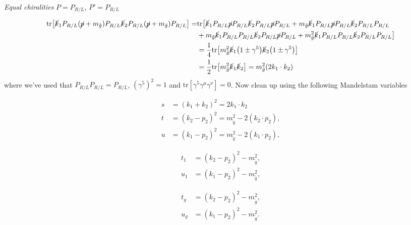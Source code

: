 \documentclass[11pt]{article}
\begin{document}
\begin{center}
\textit{Equal chiralities} $P=P_{R/L}$, $P'=P_{R/L}$
\end{center}
\begin{align*}
\text{tr} \big[ 
\cancel{k}_1 P_{R/L} (\cancel{p} + m_{\tilde{g}}) P_{R/L} \cancel{k}_2 P_{R/L} (\cancel{p} + m_{\tilde{g}}) P_{R/L} \big]=& \text{tr} \big[ 
\cancel{k}_1 P_{R/L} \cancel{p} P_{R/L} \cancel{k}_2 P_{R/L} \cancel{p}  P_{R/L}
+ m_{\tilde{g}} \cancel{k}_1 P_{R/L} \cancel{p} P_{R/L} \cancel{k}_2 P_{R/L} P_{R/L}\\
&+ m_{\tilde{g}} \cancel{k}_1 P_{R/L}P_{R/L} \cancel{k}_2 P_{R/L} \cancel{p} P_{R/L}
+ m_{\tilde{g}}^2 \cancel{k}_1 P_{R/L}  P_{R/L} \cancel{k}_2 P_{R/L} P_{R/L} \big]\\
&= \frac{1}{4} \text{tr} \big[ m_{\tilde{g}}^2 \cancel{k}_1 \big( 1 \pm \gamma^5 \big) \cancel{k}_2 \big( 1 \pm \gamma^5 \big)\big]\\
&= \frac{1}{2} \text{tr} \big[ m_{\tilde{g}}^2 \cancel{k}_1 \cancel{k}_2\big] =  m_{\tilde{g}}^2 (2 k_1 \cdot k_2)
\end{align*}
where we've used that $P_{R/L}P_{R/L} = P_{R/L}$, $(\gamma^5)^2 = 1$ and $\text{tr}[\gamma^5 \gamma^{\mu} \gamma^{\nu}]=0$. Now clean up using the following Mandelstam variables
\begin{multicols}{3}

\begin{align*}
s &= (k_1 + k_2)^2 = 2 k_1 \cdot k_2\\
t &= (k_2-p_2)^2 = m_{\tilde{q}}^2 - 2 (k_2 \cdot p_2),\\
u &= (k_1 - p_2)^2 = m_{\tilde{q}}^2 - 2 (k_1 \cdot p_2),
\end{align*}

\begin{align*}
t_1 &= (k_2-p_2)^2 - m_{\tilde{q}}^2,\\
u_1 &= (k_1-p_2)^2 - m_{\tilde{q}}^2,
\end{align*}

\begin{align*}
t_g &= (k_2-p_2)^2 - m_{\tilde{g}}^2,\\
u_g &= (k_1-p_2)^2 - m_{\tilde{g}}^2.
\end{align*}

\end{multicols}
\end{document}
